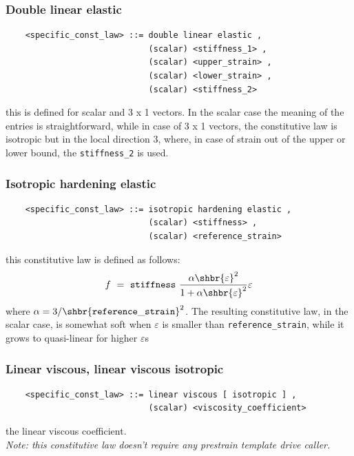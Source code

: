 \documentclass[10pt,dvips]{report}
\begin{document}
\subsubsection{Double linear elastic}
\begin{verbatim}
    <specific_const_law> ::= double linear elastic ,
                             (scalar) <stiffness_1> ,
                             (scalar) <upper_strain> ,
                             (scalar) <lower_strain> ,
                             (scalar) <stiffness_2>
\end{verbatim}
this is defined for scalar and 3 x 1 vectors. In the scalar case the
meaning of the entries is straightforward, while in case of 3 x 1 vectors,
the constitutive law is isotropic but in the local direction 3, where, in
case of strain out of the upper or lower bound, the {\tt stiffness\_2} is
used.

\subsubsection{Isotropic hardening elastic}
\begin{verbatim}
    <specific_const_law> ::= isotropic hardening elastic ,
                             (scalar) <stiffness> ,
                             (scalar) <reference_strain>
\end{verbatim}
this constitutive law is defined as follows:
\begin{displaymath}
    f \ = \ {\tt stiffness} \ \frac{
        \alpha\shbr{\varepsilon}^2
    }{
        1+\alpha\shbr{\varepsilon}^2
    }\varepsilon
\end{displaymath}
where $ \alpha=3/\shbr{\tt reference\_strain}^2 $. The resulting
constitutive law, in the scalar case, is somewhat soft when
$ \varepsilon $ is smaller than {\tt reference\_strain}, while it grows to
quasi-linear for higher $ \varepsilon$s

\subsubsection{Linear viscous, linear viscous isotropic}
\begin{verbatim}
    <specific_const_law> ::= linear viscous [ isotropic ] , 
                             (scalar) <viscosity_coefficient>
\end{verbatim}
the linear viscous coefficient. \\
{\em 
    Note: this constitutive law doesn't require any prestrain template
    drive caller.
}
  
\end{document}
